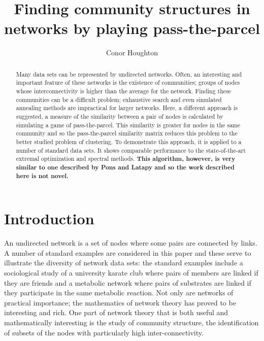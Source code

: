 \documentclass[12pt]{iopart}
\begin{document}
\title[Finding community structures in networks by playing pass-the-parcel]{Finding community structures in networks by playing pass-the-parcel}

\author{Conor Houghton}

\address{School of Mathematics, Trinity College Dublin, Dublin 2, Ireland}
\begin{abstract}
Many data sets can be represented by undirected networks. Often, an
interesting and important feature of these networks is the existence
of communities; groups of nodes whose interconnectivity is higher than
the average for the network. Finding these communities can be a
difficult problem; exhaustive search and even simulated annealing
methods are impractical for larger networks. Here, a different
approach is suggested, a measure of the similarity between a pair of
nodes is calculated by simulating a game of pass-the-parcel. This
similarity is greater for nodes in the same community and so the
pass-the-parcel similarity matrix reduces this problem to the better
studied problem of clustering. To demonstrate this approach, it is
applied to a number of standard data sets. It shows comparable
performance to the state-of-the-art extremal optimization and spectral
methods. {\bf This algorithm, however, is very similar to one described by
Pons and Latapy \cite{PonsLatapy2005a} and so the work described here
is not novel.}



\end{abstract}

\maketitle
%

\section{Introduction}
\label{intro}
An undirected network is a set of nodes where some pairs are connected
by links. A number of standard examples are considered in this paper
and these serve to illustrate the diversity of network data sets: the
standard examples include a sociological study of a university karate
club where pairs of members are linked if they are friends and a
metabolic network where pairs of substrates are linked if they
participate in the same metabolic reaction.  Not only are networks of
practical importance; the mathematics of network theory has proved to
be interesting and rich. One part of network theory that is both useful
and mathematically interesting is the study of community structure,
the identification of subsets of the nodes with particularly high
inter-connectivity.
\end{document}
